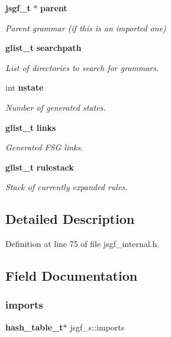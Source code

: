 \begin{DoxyCompactItemize}
\textbf{ jsgf\+\_\+t} $\ast$ \textbf{ parent}
\begin{DoxyCompactList}\small\item\em Parent grammar (if this is an imported one) \end{DoxyCompactList}\item 
\textbf{ glist\+\_\+t} \textbf{ searchpath}
\begin{DoxyCompactList}\small\item\em List of directories to search for grammars. \end{DoxyCompactList}\item 
int \textbf{ nstate}
\begin{DoxyCompactList}\small\item\em Number of generated states. \end{DoxyCompactList}\item 
\textbf{ glist\+\_\+t} \textbf{ links}
\begin{DoxyCompactList}\small\item\em Generated F\+SG links. \end{DoxyCompactList}\item 
\textbf{ glist\+\_\+t} \textbf{ rulestack}
\begin{DoxyCompactList}\small\item\em Stack of currently expanded rules. \end{DoxyCompactList}\end{DoxyCompactItemize}


\subsection{Detailed Description}


Definition at line 75 of file jsgf\+\_\+internal.\+h.



\subsection{Field Documentation}
\mbox{\label{structjsgf__s_a7efd071684d4ef7f077b0b06ce7bbc78}} 
\subsubsection{imports}
{\footnotesize\ttfamily \textbf{ hash\+\_\+table\+\_\+t}$\ast$ jsgf\+\_\+s\+::imports}



